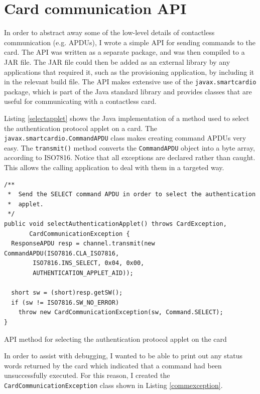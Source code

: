 \documentclass[12pt,a4paper,twoside,openright]{report}
\begin{document}
\section{Card communication API}

In order to abstract away some of the low-level details of contactless communication (e.g. APDUs), I wrote a simple API for sending commands to the card. The API was written as a separate package, and was then compiled to a JAR file. The JAR file could then be added as an external library by any applications that required it, such as the provisioning application, by including it in the relevant build file. The API makes extensive use of the \texttt{javax.smartcardio} package, which is part of the Java standard library and provides classes that are useful for communicating with a contactless card.

Listing \autoref{selectapplet} shows the Java implementation of a method used to select the authentication protocol applet on a card. The \texttt{javax.smartcardio.CommandAPDU} class makes creating command APDUs very easy. The \texttt{transmit()} method converts the \texttt{CommandAPDU} object into a byte array, according to ISO7816. Notice that all exceptions are declared rather than caught. This allows the calling application to deal with them in a targeted way.

\begin{listing}
\begin{verbatim}
/**
 *  Send the SELECT command APDU in order to select the authentication 
 *  applet.
 */
public void selectAuthenticationApplet() throws CardException,
       CardCommunicationException {
  ResponseAPDU resp = channel.transmit(new CommandAPDU(ISO7816.CLA_ISO7816,
        ISO7816.INS_SELECT, 0x04, 0x00,
        AUTHENTICATION_APPLET_AID));

  short sw = (short)resp.getSW();
  if (sw != ISO7816.SW_NO_ERROR)
    throw new CardCommunicationException(sw, Command.SELECT);
}
\end{verbatim}
\caption{API method for selecting the authentication protocol applet on the card}
\label{selectapplet}
\end{listing}

In order to assist with debugging, I wanted to be able to print out any status words returned by the card which indicated that a command had been unsuccessfully executed. For this reason, I created the \texttt{CardCommunicationException} class shown in Listing \autoref{commexception}.
\end{document}
